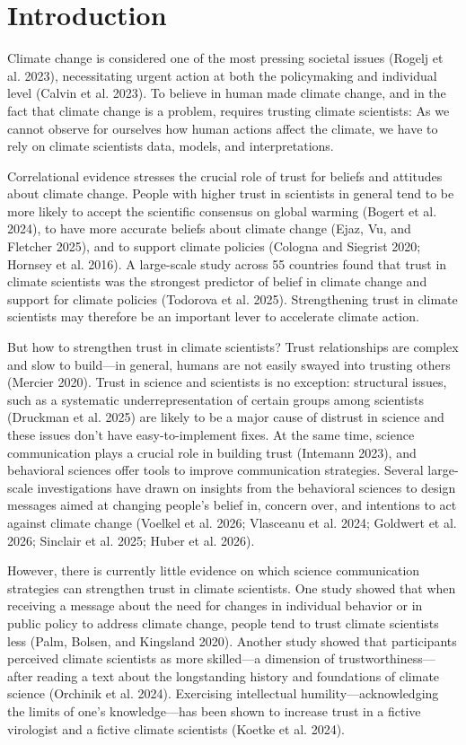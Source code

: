 \documentclass[
  letterpaper,
  DIV=11,
  numbers=noendperiod]{scrartcl}
\begin{document}
\clearpage

\section{Introduction}\label{introduction}

Climate change is considered one of the most pressing societal issues
(Rogelj et al. 2023), necessitating urgent action at both the
policymaking and individual level (Calvin et al. 2023). To believe in
human made climate change, and in the fact that climate change is a
problem, requires trusting climate scientists: As we cannot observe for
ourselves how human actions affect the climate, we have to rely on
climate scientists data, models, and interpretations.

Correlational evidence stresses the crucial role of trust for beliefs
and attitudes about climate change. People with higher trust in
scientists in general tend to be more likely to accept the scientific
consensus on global warming (Bogert et al. 2024), to have more accurate
beliefs about climate change (Ejaz, Vu, and Fletcher 2025), and to
support climate policies (Cologna and Siegrist 2020; Hornsey et al.
2016). A large-scale study across 55 countries found that trust in
climate scientists was the strongest predictor of belief in climate
change and support for climate policies (Todorova et al. 2025).
Strengthening trust in climate scientists may therefore be an important
lever to accelerate climate action.

But how to strengthen trust in climate scientists? Trust relationships
are complex and slow to build---in general, humans are not easily swayed
into trusting others (Mercier 2020). Trust in science and scientists is
no exception: structural issues, such as a systematic
underrepresentation of certain groups among scientists (Druckman et al.
2025) are likely to be a major cause of distrust in science and these
issues don't have easy-to-implement fixes. At the same time, science
communication plays a crucial role in building trust (Intemann 2023),
and behavioral sciences offer tools to improve communication strategies.
Several large-scale investigations have drawn on insights from the
behavioral sciences to design messages aimed at changing people's belief
in, concern over, and intentions to act against climate change (Voelkel
et al. 2026; Vlasceanu et al. 2024; Goldwert et al. 2026; Sinclair et
al. 2025; Huber et al. 2026).

However, there is currently little evidence on which science
communication strategies can strengthen trust in climate scientists. One
study showed that when receiving a message about the need for changes in
individual behavior or in public policy to address climate change,
people tend to trust climate scientists less (Palm, Bolsen, and
Kingsland 2020). Another study showed that participants perceived
climate scientists as more skilled---a dimension of
trustworthiness---after reading a text about the longstanding history
and foundations of climate science (Orchinik et al. 2024). Exercising
intellectual humility---acknowledging the limits of one's
knowledge---has been shown to increase trust in a fictive virologist and
a fictive climate scientists (Koetke et al. 2024).
\end{document}
